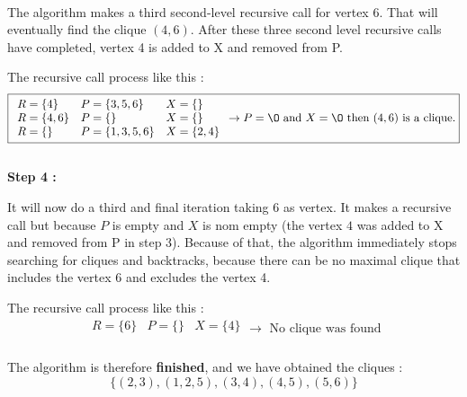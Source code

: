 \\
\begin{minipage}{0.4\textwidth}
\end{minipage}
\begin{minipage}{0.6\textwidth}
    The algorithm makes a third second-level recursive call for vertex $6$. That will eventually find the clique $(4, 6)$. After these three second level recursive calls have completed, vertex 4 is added to X and removed from P.
\end{minipage}
The recursive call process like this  :
$$ \boxed{
        \begin{array}{lll}
            R = \{4\}   & P = \{3,5,6\}   & X = \{\}    \\
            R = \{4,6\} & P = \{\}        & X = \{\}    \\
            R = \{\}    & P = \{1,3,5,6\} & X = \{2,4\} \\
        \end{array}
        \rightarrow P = \O \text{ and } X = \O \text{ then } (4,6) \text{ is a clique.}
    }$$
\\
\hspace*{1cm}  \textbf{Step 4 :}
\\
\begin{minipage}{0.4\textwidth}
\end{minipage}
\begin{minipage}{0.6\textwidth}
    It will now do a third and final iteration taking 6 as vertex. It makes a recursive call but because $P$ is empty and $X$ is nom empty (the vertex $4$ was added to X and removed from P in step 3). Because of that, the algorithm immediately stops searching for cliques and backtracks, because there can be no maximal clique that includes the  vertex 6 and excludes the vertex 4.
\end{minipage}
The recursive call process like this  :
$$ \boxed{
        \begin{array}{lll}
            R = \{6\} & P = \{\} & X = \{4\} \\
        \end{array}
        \rightarrow \text{ No clique was found}
    }$$
\\
The algorithm is therefore \textbf{finished}, and we have obtained the cliques :
$$\{(2,3),(1,2,5),(3,4),(4,5),(5,6)\}$$

